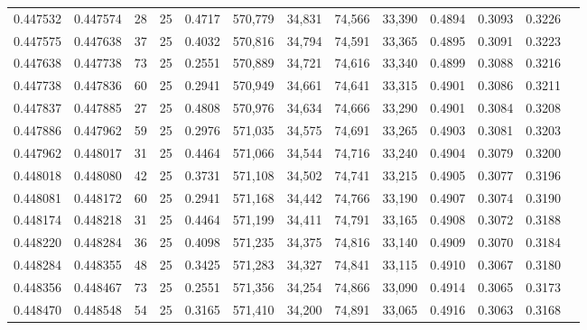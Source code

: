 \begin{tabular}{rrrrrrrrrrrrr}
0.447532 & 0.447574 &    28 &  25 &                                     0.4717 & 570,779 &  34,831 &  74,566 &  33,390 & 0.4894 & 0.3093 & 0.3226 \\
0.447575 & 0.447638 &    37 &  25 &                                     0.4032 & 570,816 &  34,794 &  74,591 &  33,365 & 0.4895 & 0.3091 & 0.3223 \\
0.447638 & 0.447738 &    73 &  25 &                                     0.2551 & 570,889 &  34,721 &  74,616 &  33,340 & 0.4899 & 0.3088 & 0.3216 \\
0.447738 & 0.447836 &    60 &  25 &                                     0.2941 & 570,949 &  34,661 &  74,641 &  33,315 & 0.4901 & 0.3086 & 0.3211 \\
0.447837 & 0.447885 &    27 &  25 &                                     0.4808 & 570,976 &  34,634 &  74,666 &  33,290 & 0.4901 & 0.3084 & 0.3208 \\
0.447886 & 0.447962 &    59 &  25 &                                     0.2976 & 571,035 &  34,575 &  74,691 &  33,265 & 0.4903 & 0.3081 & 0.3203 \\
0.447962 & 0.448017 &    31 &  25 &                                     0.4464 & 571,066 &  34,544 &  74,716 &  33,240 & 0.4904 & 0.3079 & 0.3200 \\
0.448018 & 0.448080 &    42 &  25 &                                     0.3731 & 571,108 &  34,502 &  74,741 &  33,215 & 0.4905 & 0.3077 & 0.3196 \\
0.448081 & 0.448172 &    60 &  25 &                                     0.2941 & 571,168 &  34,442 &  74,766 &  33,190 & 0.4907 & 0.3074 & 0.3190 \\
0.448174 & 0.448218 &    31 &  25 &                                     0.4464 & 571,199 &  34,411 &  74,791 &  33,165 & 0.4908 & 0.3072 & 0.3188 \\
0.448220 & 0.448284 &    36 &  25 &                                     0.4098 & 571,235 &  34,375 &  74,816 &  33,140 & 0.4909 & 0.3070 & 0.3184 \\
0.448284 & 0.448355 &    48 &  25 &                                     0.3425 & 571,283 &  34,327 &  74,841 &  33,115 & 0.4910 & 0.3067 & 0.3180 \\
0.448356 & 0.448467 &    73 &  25 &                                     0.2551 & 571,356 &  34,254 &  74,866 &  33,090 & 0.4914 & 0.3065 & 0.3173 \\
0.448470 & 0.448548 &    54 &  25 &                                     0.3165 & 571,410 &  34,200 &  74,891 &  33,065 & 0.4916 & 0.3063 & 0.3168 \\

\end{tabular}
